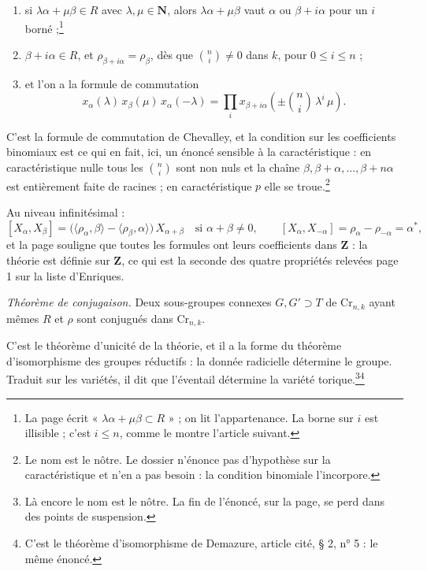 \documentclass[11pt,a4paper]{article}
\begin{document}
\begin{enumerate}
  \item[1)] si $\lambda\alpha + \mu\beta \in R$ avec $\lambda, \mu \in
    \mathbf{N}$, alors $\lambda\alpha + \mu\beta$ vaut $\alpha$ ou $\beta +
    i\alpha$ pour un $i$ borné ;\footnote{La page écrit « $\lambda\alpha +
    \mu\beta \subset R$ » ; on lit l'appartenance. La borne sur $i$ est
    illisible ; c'est $i \leq n$, comme le montre l'article suivant.}
  \item[2)] $\beta + i\alpha \in R$, et $\rho_{\beta+i\alpha} = \rho_\beta$,
    dès que $\binom{n}{i} \neq 0$ dans $k$, pour $0 \leq i \leq n$ ;
  \item[3)] et l'on a la formule de commutation
    \[
      x_\alpha(\lambda)\,x_\beta(\mu)\,x_\alpha(-\lambda)
        = \prod_i x_{\beta+i\alpha}\!\left(\pm \binom{n}{i}\,
          \lambda^{i}\,\mu\right).
    \]
\end{enumerate}

C'est la formule de commutation de Chevalley, et la condition sur les
coefficients binomiaux est ce qui en fait, ici, un énoncé sensible à la
caractéristique : en caractéristique nulle tous les $\binom{n}{i}$ sont non
nuls et la chaîne $\beta, \beta+\alpha, \ldots, \beta+n\alpha$ est entièrement
faite de racines ; en caractéristique $p$ elle se troue.\footnote{Le nom est le
nôtre. Le dossier n'énonce pas d'hypothèse sur la caractéristique et n'en a pas
besoin : la condition binomiale l'incorpore.}

Au niveau infinitésimal :
\[
  [X_\alpha, X_\beta] = \bigl(\langle \rho_\alpha, \beta \rangle -
    \langle \rho_\beta, \alpha \rangle\bigr)\, X_{\alpha+\beta}
  \quad \text{si } \alpha + \beta \neq 0, \qquad
  [X_\alpha, X_{-\alpha}] = \rho_\alpha - \rho_{-\alpha} = \alpha^{*},
\]
et la page souligne que toutes les formules ont leurs coefficients dans
$\mathbf{Z}$ : la théorie est définie sur $\mathbf{Z}$, ce qui est la seconde
des quatre propriétés relevées page 1 sur la liste d'Enriques.

\emph{Théorème de conjugaison.} Deux sous-groupes connexes $G, G' \supset T$ de
$\mathrm{Cr}_{n,k}$ ayant mêmes $R$ et $\rho$ sont conjugués dans
$\mathrm{Cr}_{n,k}$.

C'est le théorème d'unicité de la théorie, et il a la forme du
théorème d'isomorphisme des groupes réductifs : la donnée radicielle détermine
le groupe. Traduit sur les variétés, il dit que l'éventail détermine la variété
torique.\footnote{Là encore le nom est le nôtre. La fin de l'énoncé, sur la
page, se perd dans des points de suspension.}\footnote{C'est le théorème
d'isomorphisme de Demazure, article cité, § 2, n° 5 : le même énoncé.}
\end{document}
